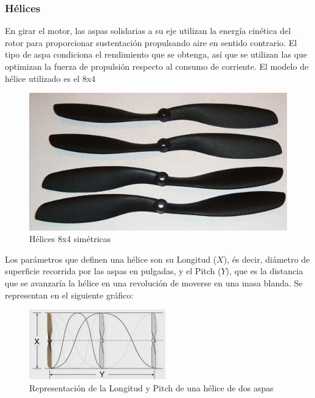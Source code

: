 \documentclass[twoside,11pt]{book}
\begin{document}
\subsubsection*{Hélices}

En girar el motor, las aspas solidarias a su eje utilizan la energía cinética del rotor para proporcionar sustentación propulsando aire en sentido contrario. El tipo de aspa condiciona el rendimiento que se obtenga, así que se utilizan las que optimizan la fuerza de propulsión respecto al consumo de corriente. El modelo de hélice utilizado es el 8x4

\begin{figure}[h!]
\begin{center}
\includegraphics[scale=0.65,bb=0 0 450 283]{images/propellers4.png}
\caption{Hélices 8x4 simétricas}
\end{center}
\end{figure}


Los parámetros que definen una hélice son su Longitud ($X$), és decir, diámetro de superficie recorrida por las aspas en pulgadas, y el Pitch ($Y$), que es la distancia que se avanzaría la hélice en una revolución de moverse en una masa blanda. Se representan en el siguiente gráfico:

\begin{figure}[h!]
\begin{center}
\includegraphics[scale=0.9,bb=0 0 244 115]{images/propeller_xy.png}
\caption{Representación de la Longitud y Pitch de una hélice de dos aspas}
\end{center}
\end{figure} 
\end{document}
